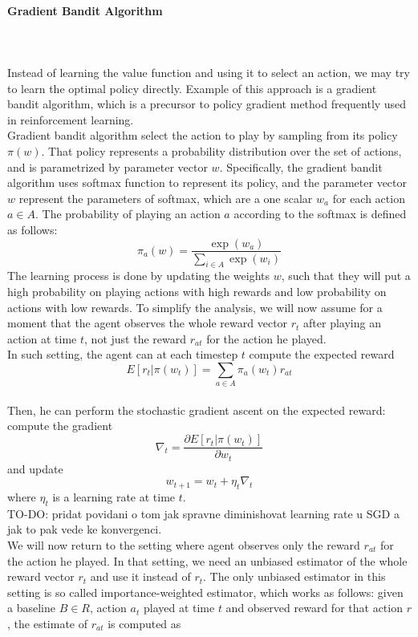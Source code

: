 \documentclass{article}
\theoremstyle{remark}
\theoremstyle{definition}
\begin{document}
\paragraph{Gradient Bandit Algorithm} \mbox{} \\ \\
Instead of learning the value function and using it to select an action, we may try to learn the optimal policy directly. Example of this approach is a gradient bandit algorithm, which is a precursor to policy gradient method frequently used in reinforcement learning. \\
Gradient bandit algorithm select the action to play by sampling from its policy $\pi(w)$. That policy represents a probability distribution over the set of actions, and is parametrized by parameter vector $w$. Specifically, the gradient bandit algorithm uses softmax function to represent its policy, and the parameter vector $w$ represent the parameters of softmax, which are a one scalar $w_a$ for each action $a \in A$. The probability of playing an action $a$ according to the softmax is defined as follows:
$$
\pi_a(w) = \frac{\exp(w_a)}{\sum_{i \in A}\exp(w_i)}
$$
The learning process is done by updating the weights $w$, such that they will put a high probability on playing actions with high rewards and low probability on actions with low rewards. To simplify the analysis, we will now assume for a moment that the agent observes the whole reward vector $r_t$ after playing an action at time $t$, not just the reward $r_{at}$ for the action he played.\\
In such setting, the agent can at each timestep $t$ compute the expected reward
$$
E\left[ r_t | \pi(w_t)\right] = \sum_{a \in A} \pi_a(w_t) r_{at}
$$\\
Then, he can perform the stochastic gradient ascent on the expected reward: compute the gradient
$$
\nabla_t = \frac{\partial E\left[ r_t | \pi(w_t)\right]}{\partial w_t}
$$
and update
$$
w_{t+1} = w_t +\eta_t \nabla_t
$$
where $\eta_t$ is a learning rate at time $t$. \\
TO-DO: pridat povidani o tom jak spravne diminishovat learning rate u SGD a jak to pak vede ke konvergenci.
\\ We will now return to the setting where agent observes only the reward $r_{at}$ for the action he played. In that setting, we need an unbiased estimator of the whole reward vector $r_t$ and use it instead of $r_t$. The only unbiased estimator in this setting is so called importance-weighted estimator, which works as follows: given a baseline $B \in R$, action $a_t$ played at time $t$ and observed reward for that action $r$, the estimate of $r_{at}$ is computed as
\end{document}
